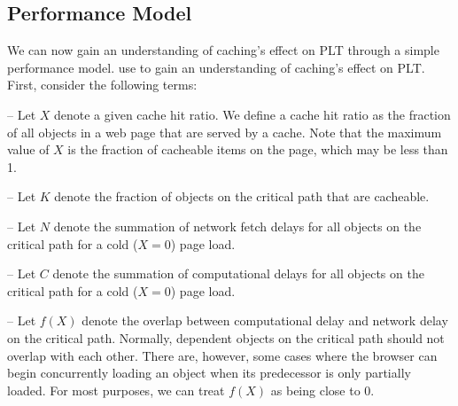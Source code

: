 

\subsection{Performance Model}
\label{subsec:model}
We can now gain an understanding of caching's effect on PLT through a simple performance model.
use to gain an understanding of caching's effect on PLT.
First, consider the following terms:

\noindent-- Let $X$ denote a given cache hit ratio. We define a cache hit ratio as the fraction
of all objects in a web page that are served by a cache. Note that the maximum
value of $X$ is the fraction of cacheable items on the page, which may be less than 1.

\noindent-- Let $K$ denote the fraction of objects on the critical path that
are cacheable.

\noindent-- Let $N$ denote the summation of network fetch delays for all objects on the
critical path for a cold ($X=0$) page load.

\noindent-- Let $C$ denote the summation of computational delays for all
objects on the critical path for a cold ($X=0$) page load.

\noindent-- Let $f(X)$ denote the overlap between computational delay and
network delay on the critical path. Normally, dependent objects on the
critical path should not overlap with each other. There are, however, some cases where the browser can begin concurrently loading an object
when its predecessor is only partially loaded.
For most purposes, we can treat $f(X)$
as being close to 0.

